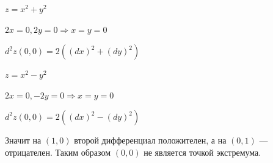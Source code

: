\begin{example}{}{}
    \( z = x^2 + y^2 \)

    \( 2x = 0, 2y = 0 \Rightarrow x = y = 0 \)

    \( d^2 z (0, 0) = 2 ( (dx)^2 + (dy)^2 ) \)
\end{example}

\begin{example}{}{}
    \( z = x^2 - y^2 \)

    \( 2x = 0, -2y = 0 \Rightarrow x = y = 0 \)

    \( d^2 z (0, 0) = 2 ( (dx)^2 - (dy)^2 ) \)

    Значит на \( (1, 0) \) второй дифференциал положителен,
    а на \( (0, 1) \) --- отрицателен.
    Таким образом \( (0, 0) \) не является точкой экстремума.
\end{example}

